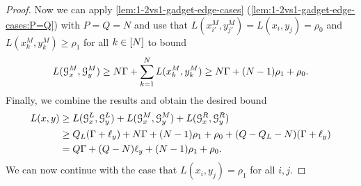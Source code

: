 \begin{proof}
Now we can apply \autoref{lem:1-2vs1-gadget-edge-cases} (\ref{lem:1-2vs1-gadget-edge-cases:P=Q}) with $P=Q=N$ and use that $L(x^M_{i'}, y^M_{j'}) = L(x_i, y_j) = \rho_0$ and $L(x^M_k, y^M_k) \geq \rho_1$ for all $k \in [N]$ to bound
\[
L(\mathcal{G}^M_x, \mathcal{G}^M_y) \geq N\Gamma + \sum_{k=1}^N L(x^M_k, y^M_k) \geq N\Gamma + (N-1)\rho_1 + \rho_0.
\]
Finally, we combine the results and obtain the desired bound
\begin{align*}
L(x,y) &\geq L(\mathcal{G}^L_x, \mathcal{G}^L_y) + L(\mathcal{G}^M_x, \mathcal{G}^M_y) + L(\mathcal{G}^R_x, \mathcal{G}^R_y)\\
	&\geq Q_L(\Gamma + \ell_y) + N\Gamma + (N-1)\rho_1 + \rho_0 + (Q - Q_L - N)(\Gamma + \ell_y) \\
	&= Q\Gamma + (Q-N)\ell_y + (N-1)\rho_1 + \rho_0.
\end{align*}
We can now continue with the case that $L(x_i, y_j) = \rho_1$ for all $i, j$.
\end{proof}
